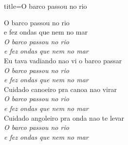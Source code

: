 \documentclass[fontsize=14pt, paper=a4, twoside, DIV=20]{scrreprt} %
\begin{document}
\begin{multicols*}{2}
\begin{song}{title={O barco passou no rio}}
        \begin{verse*}
            O barco passou no rio \\
            e fez ondas que nem no mar\\
            \textit{O barco passou no rio \\
            e fez ondas que nem no mar}\\
            Eu tava vadiando nao vi o barco passar\\
            \textit{O barco passou no rio\\
            e fez ondas que nem no mar}\\
            Cuidado canoeiro pra canoa nao virar\\
            \textit{O barco passou no rio \\
            e fez ondas que nem no mar}\\
            Cuidado angoleiro pra onda nao te levar\\
            \textit{O barco passou no rio\\
            e fez ondas que nem no mar}\\
        \end{verse*}
\end{song}



\end{multicols*}
\end{document}
